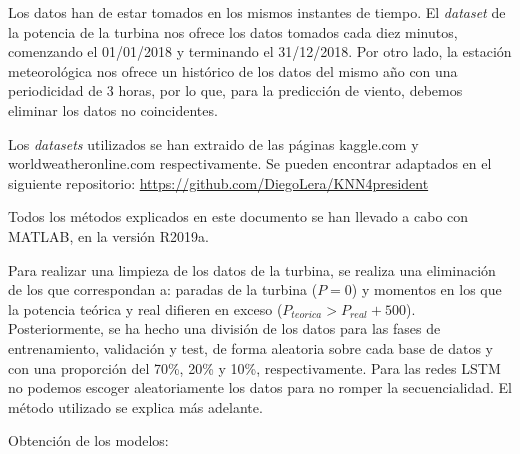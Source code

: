 \documentclass[journal]{IEEEtran}
\begin{document}
Los datos han de estar tomados en los mismos instantes de tiempo. El \emph{dataset} de la potencia de la turbina nos ofrece los datos tomados cada diez minutos, comenzando el 01/01/2018 y terminando el 31/12/2018.  Por otro lado, la estación meteorológica nos ofrece un histórico de los datos del mismo año con una periodicidad de 3 horas, por lo que, para la predicción de viento, debemos eliminar los datos no coincidentes.  


Los \emph{datasets} utilizados se han extraido de las páginas kaggle.com y worldweatheronline.com respectivamente. Se pueden encontrar adaptados en el siguiente repositorio: \url{https://github.com/DiegoLera/KNN4president}  %

Todos los métodos explicados en este documento se han llevado a cabo con MATLAB, en la versión R2019a.

Para realizar una limpieza de los datos de la turbina, se realiza una eliminación de los que correspondan a: paradas de la turbina ($P=0$) y momentos en los que la potencia teórica y real difieren en exceso ($P_{teorica}>P_{real}+500$).
Posteriormente, se ha hecho una división de los datos para las fases de entrenamiento, validación y test, de forma aleatoria sobre cada base de datos y con una proporción del 70\%, 20\% y 10\%, respectivamente. Para las redes LSTM no podemos escoger aleatoriamente los datos para no romper la secuencialidad. El método utilizado se explica más adelante.

Obtención de los modelos:
\end{document}

